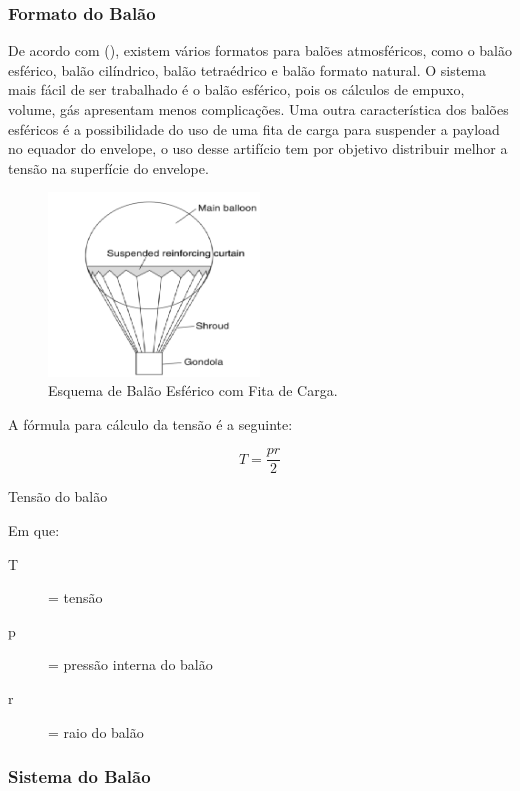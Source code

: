 \subsubsection{Formato do Balão}
	De acordo com  (\citeyear{yajima}), existem vários formatos para balões atmosféricos, como o balão esférico, balão cilíndrico, balão tetraédrico e balão formato natural. O sistema mais fácil de ser trabalhado é o balão esférico, pois os cálculos de empuxo, volume, gás  apresentam menos complicações. Uma outra característica dos balões esféricos é a possibilidade do uso de uma fita de carga para suspender a payload no equador do envelope, o uso desse artifício tem por objetivo distribuir melhor a tensão na superfície do envelope.

	\begin{figure}[H]
		\centering
		\includegraphics[width=0.5\textwidth]{figuras/balaoEsferico}
		\caption{Esquema de Balão Esférico com Fita de Carga.}
		\label{img:balaoEsferico}
	\end{figure}

	A fórmula para cálculo da tensão é a seguinte:

	\begin{equacao}
		\begin{equation}
			T = \frac{pr}{2}
		\end{equation}
		\caption{Tensão do balão}
		\label{eqn:calculoTensao}
	\end{equacao}

	Em que:
	\begin{description}
		\item[T] = tensão
		\item[p] = pressão interna do balão
		\item[r] = raio do balão
	\end{description}

\subsubsection{Sistema do Balão}

